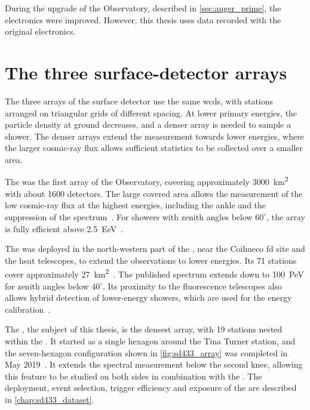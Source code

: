 \documentclass[main.tex]{subfiles}
\begin{document}
During the upgrade of the Observatory, described in \cref{sec:auger_prime}, the electronics were improved.
However, this thesis uses data recorded with the original electronics.

\section{The three surface-detector arrays}
\label{sec:auger_surface_arrays}

The three arrays of the surface detector use the same \gls{wcd}s, with stations arranged on triangular grids of different spacing.
At lower primary energies, the particle density at ground decreases, and a denser array is needed to sample a shower.
The denser arrays extend the measurement towards lower energies, where the larger cosmic-ray flux allows sufficient statistics to be collected over a smaller area.

The  was the first array of the Observatory, covering approximately \SI{3000}{\km\squared} with about 1600 detectors.
The large covered area allows the measurement of the low cosmic-ray flux at the highest energies, including the ankle and the suppression of the spectrum~\cite{PierreAuger:2020:Spectrum,PierreAuger:2025:Declination}.
For showers with zenith angles below $60^\circ$, the array is fully efficient above \SI{2.5}{\exa\eV}~\cite{PierreAuger:2020:Spectrum}.

The  was deployed in the north-western part of the , near the Coihueco \gls{fd} site and the \gls{heat} telescopes, to extend the observations to lower energies.
Its 71 stations cover approximately \SI{27}{\km\squared}~\cite{Silli:2021:Thesis}.
The published  spectrum extends down to \SI{100}{\peta\eV} for zenith angles below $40^\circ$.
Its proximity to the fluorescence telescopes also allows hybrid detection of lower-energy showers, which are used for the energy calibration~\cite{PierreAuger:2021:InfillSpectrum}.

The , the subject of this thesis, is the densest array, with 19 stations nested within the .
It started as a single hexagon around the Tina Turner station, and the seven-hexagon configuration shown in \cref{fig:sd433_array} was completed in May 2019~\cite{Silli:2021:PerformanceSD433}.
It extends the spectral measurement below the second knee, allowing this feature to be studied on both sides in combination with the .
The deployment, event selection, trigger efficiency and exposure of the  are described in \cref{chap:sd433_dataset}.
\end{document}
